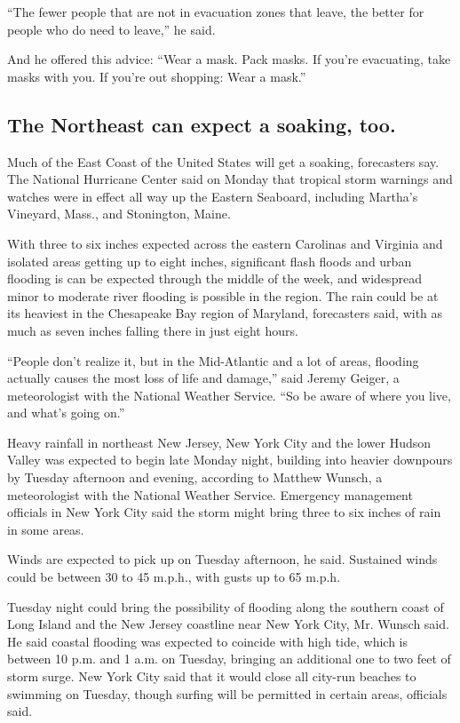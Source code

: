 ``The fewer people that are not in evacuation zones that leave, the
better for people who do need to leave,'' he said.

And he offered this advice: ``Wear a mask. Pack masks. If you're
evacuating, take masks with you. If you're out shopping: Wear a mask.''

\hypertarget{the-northeast-can-expect-a-soaking-too}{%
\subsection{The Northeast can expect a soaking,
too.}\label{the-northeast-can-expect-a-soaking-too}}

Much of the East Coast of the United States will get a soaking,
forecasters say. The National Hurricane Center said on Monday that
tropical storm warnings and watches were in effect all way up the
Eastern Seaboard, including Martha's Vineyard, Mass., and Stonington,
Maine.

With three to six inches expected across the eastern Carolinas and
Virginia and isolated areas getting up to eight inches, significant
flash floods and urban flooding is can be expected through the middle of
the week, and widespread minor to moderate river flooding is possible in
the region. The rain could be at its heaviest in the Chesapeake Bay
region of Maryland, forecasters said, with as much as seven inches
falling there in just eight hours.

``People don't realize it, but in the Mid-Atlantic and a lot of areas,
flooding actually causes the most loss of life and damage,'' said Jeremy
Geiger, a meteorologist with the National Weather Service. ``So be aware
of where you live, and what's going on.''

Heavy rainfall in northeast New Jersey, New York City and the lower
Hudson Valley was expected to begin late Monday night, building into
heavier downpours by Tuesday afternoon and evening, according to Matthew
Wunsch, a meteorologist with the National Weather Service. Emergency
management officials in New York City said the storm might bring three
to six inches of rain in some areas.

Winds are expected to pick up on Tuesday afternoon, he said. Sustained
winds could be between 30 to 45 m.p.h., with gusts up to 65 m.p.h.

Tuesday night could bring the possibility of flooding along the southern
coast of Long Island and the New Jersey coastline near New York City,
Mr. Wunsch said. He said coastal flooding was expected to coincide with
high tide, which is between 10 p.m. and 1 a.m. on Tuesday, bringing an
additional one to two feet of storm surge. New York City said that it
would close all city-run beaches to swimming on Tuesday, though surfing
will be permitted in certain areas, officials said.

